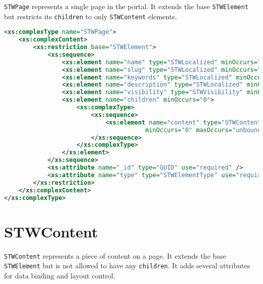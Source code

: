\texttt{STWPage} represents a single page in the portal. It extends the base \texttt{STWElement} but restricts its \texttt{children} to only \texttt{STWContent} elements.

\begin{lstlisting}[language=XML,caption={STWPage XSD Definition}]
<xs:complexType name="STWPage">
    <xs:complexContent>
        <xs:restriction base="STWElement">
            <xs:sequence>
                <xs:element name="name" type="STWLocalized" minOccurs="1" />
                <xs:element name="slug" type="STWLocalized" minOccurs="1" />
                <xs:element name="keywords" type="STWLocalized" minOccurs="0" />
                <xs:element name="description" type="STWLocalized" minOccurs="0" />
                <xs:element name="visibility" type="STWVisibility" minOccurs="0" />
                <xs:element name="children" minOccurs="0">
                    <xs:complexType>
                        <xs:sequence>
                            <xs:element name="content" type="STWContent" 
                                       minOccurs="0" maxOccurs="unbounded"/>
                        </xs:sequence>
                    </xs:complexType>
                </xs:element>
            </xs:sequence>
            <xs:attribute name="_id" type="GUID" use="required" />
            <xs:attribute name="type" type="STWElementType" use="required" />
        </xs:restriction>
    </xs:complexContent>
</xs:complexType>
\end{lstlisting}

\section{STWContent}

\texttt{STWContent} represents a piece of content on a page. It extends the base \texttt{STWElement} but is not allowed to have any \texttt{children}. It adds several attributes for data binding and layout control.

